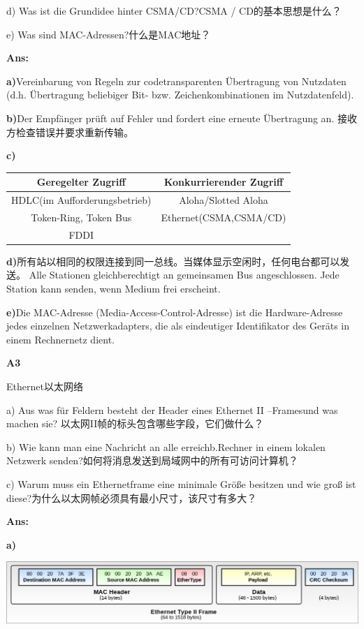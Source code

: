 \documentclass[fleqn]{article}
\begin{document}
d) Was ist die Grundidee hinter CSMA/CD?CSMA / CD的基本思想是什么？

e) Was sind MAC-Adressen?什么是MAC地址？

\textbf{Ans:}

\textbf{a)}Vereinbarung von Regeln zur codetransparenten Übertragung von Nutzdaten (d.h. Übertragung beliebiger Bit- bzw. Zeichenkombinationen im Nutzdatenfeld).

\textbf{b)}Der Empfänger prüft auf Fehler und fordert eine erneute Übertragung an. 接收方检查错误并要求重新传输。

\textbf{c)}

\begin{center}
    \begin{tabular}{c|c}
        Geregelter Zugriff&Konkurrierender Zugriff\\
        \hline
        HDLC(im Aufforderungsbetrieb)&Aloha/Slotted Aloha\\
        Token-Ring, Token Bus&Ethernet(CSMA,CSMA/CD)\\
        FDDI
    \end{tabular}
\end{center}

\textbf{d)}所有站以相同的权限连接到同一总线。当媒体显示空闲时，任何电台都可以发送。
Alle Stationen gleichberechtigt an gemeinsamen Bus angeschlossen. 
Jede Station kann senden, wenn Medium frei erscheint.

\textbf{e)}Die MAC-Adresse (Media-Access-Control-Adresse) ist die Hardware-Adresse jedes einzelnen Netzwerkadapters, die als eindeutiger Identifikator des Geräts in einem Rechnernetz dient.

\noindent\textbf{A3}

Ethernet以太网络

a) Aus was für Feldern besteht der Header eines Ethernet II –Framesund was machen sie? 以太网II帧的标头包含哪些字段，它们做什么？

b) Wie kann man eine Nachricht an alle erreichb.Rechner in einem lokalen Netzwerk senden?如何将消息发送到局域网中的所有可访问计算机？

c) Warum muss ein Ethernetframe eine minimale Größe besitzen und wie groß ist diese?为什么以太网帧必须具有最小尺寸，该尺寸有多大？

\textbf{Ans:}

\textbf{a)}

\begin{center}
    \includegraphics[scale=0.4]{bild16.png}
\end{center}
\end{document}
